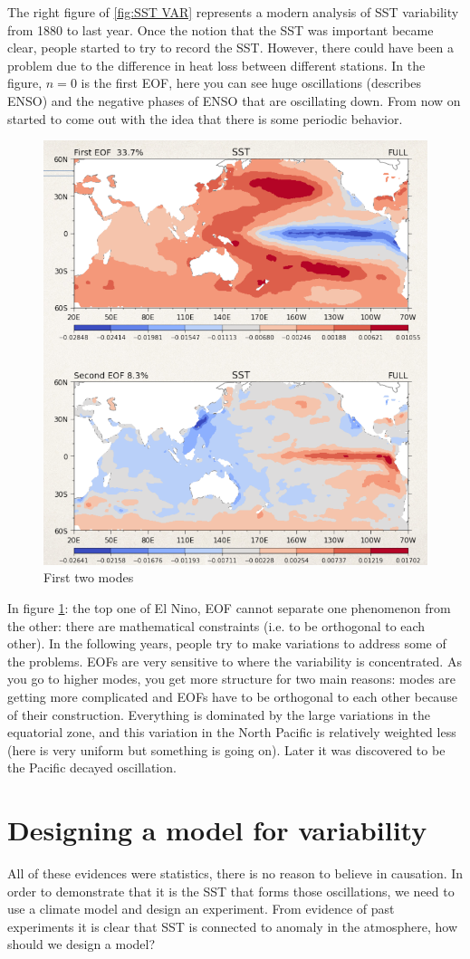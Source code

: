 The right figure of \ref{fig:SST VAR} represents a modern analysis of SST variability from 1880 to last year. Once the notion that the SST was important became clear, people started to try to record the SST. However, there could have been a problem due to the difference in heat loss between different stations. In the figure, $n=0$ is the first EOF, here you can see huge oscillations (describes ENSO) and the negative phases of ENSO that are oscillating down. From now on started to come out with the idea that there is some periodic behavior.
\begin{figure}[htpb]
	\centering
	\includegraphics[width=0.35\linewidth]{upload/Screenshot 2024-11-18 164916.png}
	\caption{First two modes}
	\label{fig:first two modes}
\end{figure}


In figure \ref{fig:first two modes}: the top one of El Nino, EOF cannot separate one phenomenon from the other: there are mathematical constraints (i.e. to be orthogonal to each other). In the following  years, people try to make variations to address some of the problems. EOFs are very sensitive to where the variability is concentrated. As you go to higher modes, you get more structure for two main reasons: modes are getting more complicated and EOFs have to be orthogonal to each other because of their construction. Everything is dominated by the large variations in the equatorial zone, and this variation in the North Pacific is relatively weighted less (here is very uniform but something is going on). Later it was discovered to be the Pacific decayed oscillation.

\section{Designing a model for variability}
All of these evidences were statistics, there is no reason to believe in causation. In order to demonstrate that it is the SST that forms those oscillations, we need to use a climate model and design an experiment.
From evidence of past experiments it is clear that SST is connected to anomaly in the atmosphere, how should we design a model?

